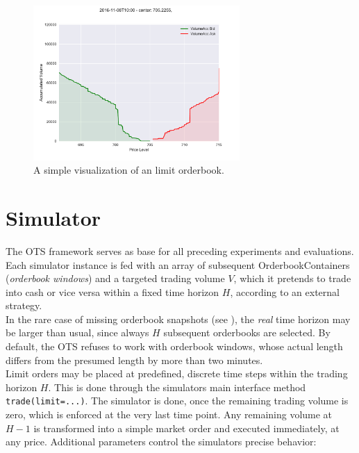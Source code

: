 \begin{figure}[ht]
	\centering
   \includegraphics[width=0.7\textwidth]{content/drawings/orderbook}
	\caption{A simple visualization of an limit orderbook.}
	\label{fig:orderbook}
\end{figure}


\section{Simulator}
The \ac{OTS} framework serves as base for all preceding experiments and evaluations.
Each simulator instance is fed with an array of subsequent OrderbookContainers (\emph{orderbook windows}) and a targeted trading volume $V$, which it pretends to trade into cash or vice versa within a fixed time horizon $H$, according to an external strategy.\\

In the rare case of missing orderbook snapshots (see ), the \emph{real} time horizon may be larger than usual, since always $H$ subsequent orderbooks are selected. By default, the \ac{OTS} refuses to work with orderbook windows, whose actual length differs from the presumed length by more than two minutes.\\

Limit orders may be placed at predefined, discrete time steps within the trading horizon $H$. This is done through the simulators main interface method \lstinline!trade(limit=...)!. The simulator is done, once the remaining trading volume is zero, which is enforced at the very last time point. Any remaining volume at $H-1$ is transformed into a simple market order and executed immediately, at any price. Additional parameters control the simulators precise behavior:

